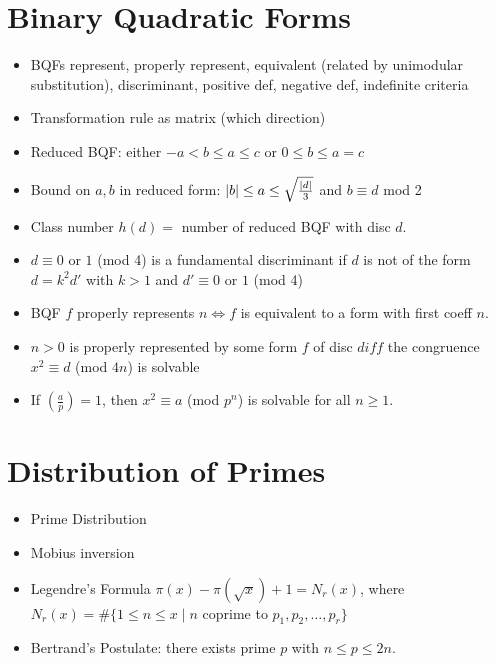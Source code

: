\section{Binary Quadratic Forms}
\begin{itemize}
    \item BQFs represent, properly represent, equivalent (related by unimodular substitution), discriminant, positive def, negative def, indefinite criteria
    \item Transformation rule as matrix (which direction)
    \item Reduced BQF: either $-a < b \leq a \leq c$ or $0 \leq b\leq a = c$
    \item Bound on $a,b$ in reduced form: $\left| b \right| \leq a \leq \sqrt{\frac{\left| d \right|}{3}}$ and $b\equiv d$ mod 2
    \item Class number $h(d)=$ number of reduced BQF with disc $d$.
    \item $d \equiv 0$ or $1$ (mod 4) is a fundamental discriminant if $d$ is not of the form $d=k^2d'$ with $k>1$ and $d' \equiv 0$ or $1$ (mod 4)  
    \item BQF $f$ properly represents $n \iff f$ is equivalent to a form with first coeff $n$.
    \item $n>0$ is properly represented by some form $f$ of disc $d iff$ the congruence $x^2 \equiv d$ (mod $4n$) is solvable
    \item If $\left(\frac{a}{p}\right) =1$, then $x^2 \equiv a$ (mod $p^n$) is solvable for all $n \geq 1$.
\end{itemize}

\section{Distribution of Primes}
\begin{itemize}
    \item Prime Distribution
    \item Mobius inversion
    \item Legendre's Formula $\pi(x)-\pi(\sqrt{x}) + 1 = N_r(x)$, where $N_r(x) = \# \{1\leq n\leq x \mid n $ coprime to $p_1,p_2,\dots, p_r\}$
    \item Bertrand's Postulate: there exists prime $p$ with $n \leq p \leq 2n$.
\end{itemize}

